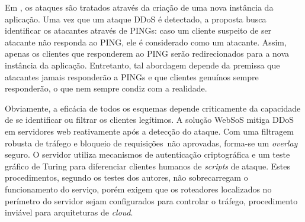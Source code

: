 Em \cite{Bakshi:10}, os ataques são tratados através da criação de uma nova instância da aplicação. Uma vez que um ataque DDoS é detectado, a proposta busca identificar os atacantes através de PINGs: caso um cliente suspeito de ser atacante não responda ao PING, ele é considerado como um atacante. Assim, apenas os clientes que responderem ao PING serão 
redirecionados para a nova instância da aplicação. Entretanto, tal abordagem depende da premissa que atacantes jamais responderão a PINGs e que clientes genuínos sempre responderão, o que nem sempre condiz com a realidade.





Obviamente, a eficácia de todos os esquemas depende criticamente da capacidade de se identificar ou filtrar os clientes legítimos. 
%
A solução WebSoS \cite{Stavrou:2005:WOS:1090583.1648614} mitiga DDoS em servidores web reativamente após a detecção do ataque. Com uma filtragem robusta de tráfego e bloqueio de requisições~não aprovadas, forma-se um \emph{overlay} seguro. O servidor utiliza mecanismos de autenticação criptográfica e um teste gráfico de Turing \cite{Dietrich00analyzingdistributed} para diferenciar clientes humanos de \emph{scripts} de ataque. Estes procedimentos, segundo os testes dos autores, não sobrecarregam o funcionamento do serviço, porém exigem que os roteadores localizados no perímetro do servidor sejam configurados para controlar o tráfego, procedimento inviável para arquiteturas de \emph{cloud}.
